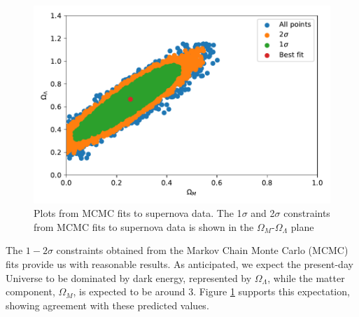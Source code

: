\documentclass{aa}
\begin{document}
\begin{figure}[h!]
   \includegraphics[scale=0.5]{Figures/milestone_1/confidence_area.pdf}
   \caption{Plots from MCMC fits to supernova data. The 1$\sigma$ and 2$\sigma$ constraints from MCMC fits to supernova data is shown in the $\Omega_M$-$\Omega_\Lambda$ plane}
\label{fig:M1_ca}
\end{figure}
The $1-2\sigma$ constraints obtained from the Markov Chain Monte Carlo (MCMC) fits provide us with reasonable results. As anticipated, we expect the present-day Universe to be dominated by dark energy, represented by $\Omega_\Lambda$, while the matter component, $\Omega_M$, is expected to be around 3. Figure \ref{fig:M1_ca} supports this expectation, showing agreement with these predicted values.
\end{document}
